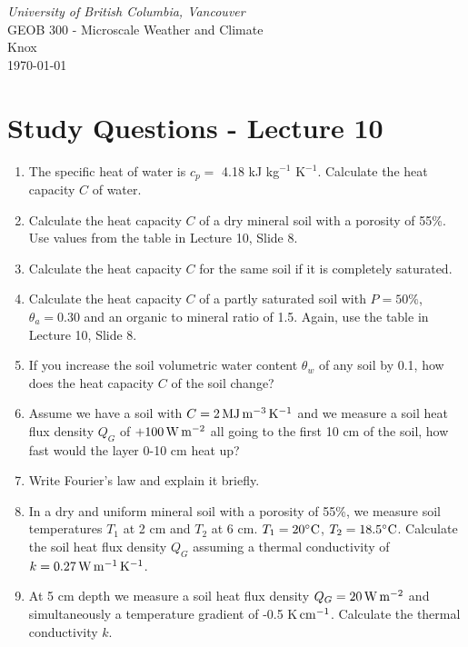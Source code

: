 \documentclass[11pt]{article}
\author{Andy Black and Andreas Christen}
\begin{document}
\begin{center}
\emph{University of British Columbia, Vancouver}\\
GEOB 300 - Microscale Weather and Climate\\
Knox\\
\today
\section*{Study Questions - Lecture 10}
\end{center}

\begin{enumerate}

\item The specific heat of water is $c_p =$ 4.18 kJ kg$^{-1}$ K$^{-1}$. Calculate the heat capacity $C$ of water.

\item Calculate the heat capacity $C$ of a dry mineral soil with a porosity of 55\%. Use values from the table in Lecture 10, Slide 8.

\item Calculate the heat capacity $C$ for the same soil if it is completely saturated.

\item Calculate the heat capacity $C$ of a partly saturated soil with $P = 50\%$, $\theta_a = 0.30$ and an organic to mineral ratio of 1.5. Again, use the table in Lecture 10, Slide 8.

\item If you increase the soil volumetric water content $\theta_w$ of any soil by 0.1, how does the heat capacity $C$ of the soil change?

\item Assume we have a soil with $C = 2\,\rm{MJ}\,\rm{m}^{-3}\,\rm{K}^{-1}$ and we measure a soil heat flux density $Q_G$ of $+100\,\rm{W}\,\rm{m}^{-2}$ all going to the first 10 cm of the soil, how fast would the layer 0-10 cm heat up?

\item Write Fourier's law and explain it briefly.

\item In a dry and uniform mineral soil with a porosity of 55\%, we measure soil temperatures $T_1$ at 2 cm and $T_2$ at 6 cm. $T_1 = 20 \rm{^{\circ}C}$, $T_2 = 18.5 \rm{^{\circ}C}$. Calculate the soil heat flux density $Q_G$ assuming a thermal conductivity of $k = 0.27\,\rm{W}\,\rm{m}^{-1}\,\rm{K}^{-1}$.

\item At 5 cm depth we measure a soil heat flux density $Q_G = 20 \,\rm{W}\,\rm{m}^{-2}$ and simultaneously a temperature gradient of -0.5 K$\,\rm{cm}^{-1}$. Calculate the thermal conductivity $k$.


\end{enumerate}
\end{document}

